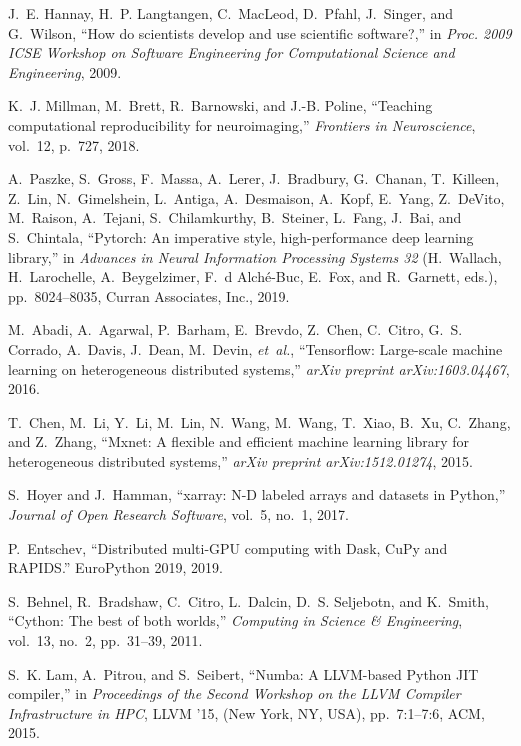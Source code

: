 \documentclass[twocolumn]{article}
\begin{document}
\begin{thebibliography}{10}
J.~E. Hannay, H.~P. Langtangen, C.~MacLeod, D.~Pfahl, J.~Singer, and G.~Wilson,
  ``How do scientists develop and use scientific software?,'' in {\em Proc.
  2009 ICSE Workshop on Software Engineering for Computational Science and
  Engineering}, 2009.

K.~J. Millman, M.~Brett, R.~Barnowski, and J.-B. Poline, ``Teaching
  computational reproducibility for neuroimaging,'' {\em Frontiers in
  Neuroscience}, vol.~12, p.~727, 2018.

A.~Paszke, S.~Gross, F.~Massa, A.~Lerer, J.~Bradbury, G.~Chanan, T.~Killeen,
  Z.~Lin, N.~Gimelshein, L.~Antiga, A.~Desmaison, A.~Kopf, E.~Yang, Z.~DeVito,
  M.~Raison, A.~Tejani, S.~Chilamkurthy, B.~Steiner, L.~Fang, J.~Bai, and
  S.~Chintala, ``Pytorch: An imperative style, high-performance deep learning
  library,'' in {\em Advances in Neural Information Processing Systems 32}
  (H.~Wallach, H.~Larochelle, A.~Beygelzimer, F.~d\textquotesingle
  Alch\'{e}-Buc, E.~Fox, and R.~Garnett, eds.), pp.~8024--8035, Curran
  Associates, Inc., 2019.

M.~Abadi, A.~Agarwal, P.~Barham, E.~Brevdo, Z.~Chen, C.~Citro, G.~S. Corrado,
  A.~Davis, J.~Dean, M.~Devin, {\em et~al.}, ``Tensorflow: Large-scale machine
  learning on heterogeneous distributed systems,'' {\em arXiv preprint
  arXiv:1603.04467}, 2016.

T.~Chen, M.~Li, Y.~Li, M.~Lin, N.~Wang, M.~Wang, T.~Xiao, B.~Xu, C.~Zhang, and
  Z.~Zhang, ``Mxnet: A flexible and efficient machine learning library for
  heterogeneous distributed systems,'' {\em arXiv preprint arXiv:1512.01274},
  2015.

S.~Hoyer and J.~Hamman, ``xarray: {N-D} labeled arrays and datasets in
  {Python},'' {\em Journal of Open Research Software}, vol.~5, no.~1, 2017.

P.~Entschev, ``{D}istributed multi-{GPU} computing with {D}ask, {C}u{P}y and
  {RAPIDS}.'' EuroPython 2019, 2019.

S.~Behnel, R.~Bradshaw, C.~Citro, L.~Dalcin, D.~S. Seljebotn, and K.~Smith,
  ``Cython: The best of both worlds,'' {\em Computing in Science \&
  Engineering}, vol.~13, no.~2, pp.~31--39, 2011.

S.~K. Lam, A.~Pitrou, and S.~Seibert, ``Numba: A {LLVM}-based {P}ython {JIT}
  compiler,'' in {\em Proceedings of the Second Workshop on the LLVM Compiler
  Infrastructure in HPC}, LLVM '15, (New York, NY, USA), pp.~7:1--7:6, ACM,
  2015.


\end{thebibliography}
\end{document}
